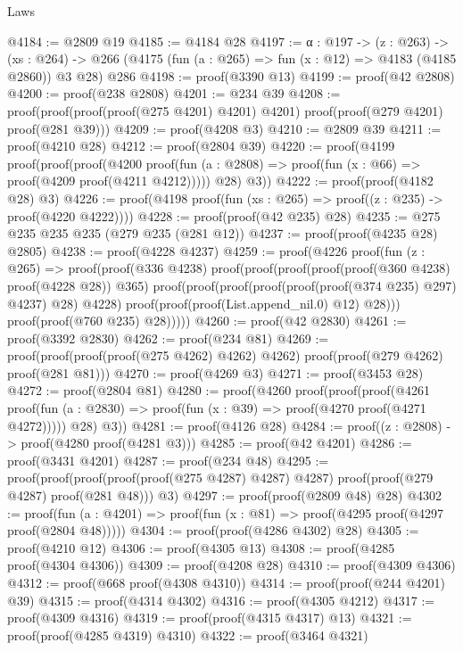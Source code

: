 \begin{lexlean}{Laws}
\begin{coremodule}
@4184 := @2809 @19
@4185 := @4184 @28
@4197 := {α : @197} ->
  (z : @263) ->
  (xs : @264) -> @266 (@4175 (fun (a : @265) => fun (x : @12) => @4183 (@4185 @2860)) @3 @28) @286
@4198 := proof(@3390 @13)
@4199 := proof(@42 @2808)
@4200 := proof(@238 @2808)
@4201 := @234 @39
@4208 := proof(proof(proof(proof(@275 @4201) @4201) @4201) proof(proof(@279 @4201) proof(@281 @39)))
@4209 := proof(@4208 @3)
@4210 := @2809 @39
@4211 := proof(@4210 @28)
@4212 := proof(@2804 @39)
@4220 := proof(@4199
      proof(proof(proof(@4200
              proof(fun (a : @2808) => proof(fun (x : @66) => proof(@4209 proof(@4211 @4212)))))
            @28)
          @3))
@4222 := proof(proof(@4182 @28) @3)
@4226 := proof(@4198 proof(fun (xs : @265) => proof((z : @235) -> proof(@4220 @4222))))
@4228 := proof(proof(@42 @235) @28)
@4235 := @275 @235 @235 @235 (@279 @235 (@281 @12))
@4237 := proof(proof(@4235 @28) @2805)
@4238 := proof(@4228 @4237)
@4259 := proof(@4226
      proof(fun (z : @265) =>
        proof(proof(@336 @4238)
            proof(proof(proof(proof(proof(@360 @4238) proof(@4228 @28)) @365)
                  proof(proof(proof(proof(proof(proof(@374 @235) @297) @4237) @28) @4228)
                      proof(proof(proof(List.append_nil.{0}) @12) @28)))
                proof(proof(@760 @235) @28)))))
@4260 := proof(@42 @2830)
@4261 := proof(@3392 @2830)
@4262 := proof(@234 @81)
@4269 := proof(proof(proof(proof(@275 @4262) @4262) @4262) proof(proof(@279 @4262) proof(@281 @81)))
@4270 := proof(@4269 @3)
@4271 := proof(@3453 @28)
@4272 := proof(@2804 @81)
@4280 := proof(@4260
      proof(proof(proof(@4261
              proof(fun (a : @2830) => proof(fun (x : @39) => proof(@4270 proof(@4271 @4272)))))
            @28)
          @3))
@4281 := proof(@4126 @28)
@4284 := proof((z : @2808) -> proof(@4280 proof(@4281 @3)))
@4285 := proof(@42 @4201)
@4286 := proof(@3431 @4201)
@4287 := proof(@234 @48)
@4295 := proof(proof(proof(proof(proof(@275 @4287) @4287) @4287)
        proof(proof(@279 @4287) proof(@281 @48)))
      @3)
@4297 := proof(proof(@2809 @48) @28)
@4302 := proof(fun (a : @4201) =>
    proof(fun (x : @81) => proof(@4295 proof(@4297 proof(@2804 @48)))))
@4304 := proof(proof(@4286 @4302) @28)
@4305 := proof(@4210 @12)
@4306 := proof(@4305 @13)
@4308 := proof(@4285 proof(@4304 @4306))
@4309 := proof(@4208 @28)
@4310 := proof(@4309 @4306)
@4312 := proof(@668 proof(@4308 @4310))
@4314 := proof(proof(@244 @4201) @39)
@4315 := proof(@4314 @4302)
@4316 := proof(@4305 @4212)
@4317 := proof(@4309 @4316)
@4319 := proof(proof(@4315 @4317) @13)
@4321 := proof(proof(@4285 @4319) @4310)
@4322 := proof(@3464 @4321)

\end{coremodule}
\end{lexlean}
